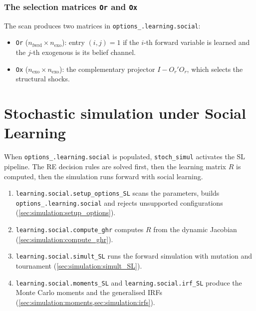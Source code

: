 \documentclass[11pt,a4paper]{article}
\newcommand{\command}[1]{\texttt{#1}}
\newcommand{\field}[1]{\texttt{#1}}
\begin{document}
\subsubsection{The selection matrices \texttt{Or} and \texttt{Ox}}

The scan produces two matrices in \field{options\_.learning.social}:

\begin{itemize}[leftmargin=2em]
\item \field{Or} ($n_{\text{fwrd}} \times n_{\text{exo}}$): entry $(i,j) = 1$
      if the $i$-th forward variable is learned and the $j$-th exogenous is its
      belief channel. 
\item \field{Ox} ($n_{\text{exo}} \times n_{\text{exo}}$): the complementary
      projector $I - O_r'O_r$, which selects the structural shocks. 
\end{itemize}

\section{Stochastic simulation under Social Learning}
\label{sec:simulation}

When \field{options\_.learning.social} is populated, \command{stoch\_simul}
activates the SL pipeline. The RE decision rules are solved first, then the learning matrix $R$
is computed, then the simulation runs forward with social learning. 

\begin{enumerate}[leftmargin=2em]
\item \texttt{learning.social.setup\_options\_SL} scans the parameters, builds
      \field{options\_.learning.social} and rejects unsupported configurations
      (\cref{sec:simulation:setup_options}).
\item \texttt{learning.social.compute\_ghr} computes $R$ from the dynamic
      Jacobian (\cref{sec:simulation:compute_ghr}).
\item \texttt{learning.social.simult\_SL} runs the forward simulation with
      mutation and tournament (\cref{sec:simulation:simult_SL}).
\item \texttt{learning.social.moments\_SL} and \texttt{learning.social.irf\_SL}
      produce the Monte Carlo moments and the generalised IRFs
      (\cref{sec:simulation:moments,sec:simulation:irfs}).
\end{enumerate}
\end{document}
